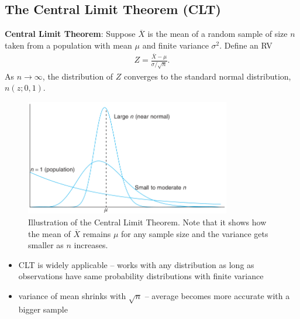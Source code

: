 \documentclass[10pt]{article}
\begin{document}
\subsection{The Central Limit Theorem (CLT)}
\begin{theorem}
    \textbf{Central Limit Theorem}: Suppose $\overline{X}$ is the mean of a random sample of size $n$ taken from a population with mean $\mu$ and finite variance $\sigma^2$. Define an RV 
    \begin{gather*}
        Z = \frac{\overline{X}-\mu}{\sigma / \sqrt{n}}
    .\end{gather*}
    As  $n\to \infty$, the distribution of $Z$ converges to the standard normal distribution, $n(z;0,1)$.
\end{theorem}
\begin{figure}[h]
    \centering
    \includegraphics[width=0.8\textwidth]{CLT}
    \caption{Illustration of the Central Limit Theorem. Note that it shows how the mean of $\overline{X}$ remains $\mu$ for any sample size and the variance gets smaller as $n$ increases.}
    \label{fig:CLT}
\end{figure}
\begin{itemize}
    \item CLT is widely applicable -- works with any distribution as long as observations have same probability distributions with finite variance
    \item variance of mean shrinks with $ \sqrt{n} $ -- average becomes more accurate with a bigger sample
\end{itemize}
\end{document}

